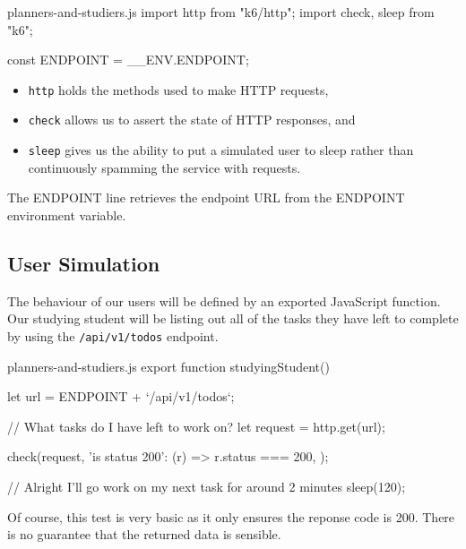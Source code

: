 \documentclass{csse4400}
\begin{document}
\begin{code}[language=JavaScript,numbers=none]{planners-and-studiers.js}
import http from "k6/http";
import { check, sleep } from "k6";

const ENDPOINT = __ENV.ENDPOINT;
\end{code}

\begin{itemize}
    \item \texttt{http} holds the methods used to make HTTP requests,
    \item \texttt{check} allows us to assert the state of HTTP responses, and
    \item \texttt{sleep} gives us the ability to put a simulated user to sleep rather than continuously spamming the service with requests.
\end{itemize}

The ENDPOINT line retrieves the endpoint URL from the ENDPOINT environment variable.

\subsection{User Simulation}

The behaviour of our users will be defined by an exported JavaScript function.
Our studying student will be listing out all of the tasks they have left to complete by using the \texttt{/api/v1/todos} endpoint.

\begin{code}[language=JavaScript,numbers=none]{planners-and-studiers.js}
export function studyingStudent() {
    let url = ENDPOINT + `/api/v1/todos`;

    // What tasks do I have left to work on?
    let request = http.get(url);

    check(request, {
        'is status 200': (r) => r.status === 200,
    });
    
    // Alright I'll go work on my next task for around 2 minutes
    sleep(120);
}
\end{code}

Of course,
this test is very basic as it only ensures the reponse code is 200.
There is no guarantee that the returned data is sensible.

\end{document}
